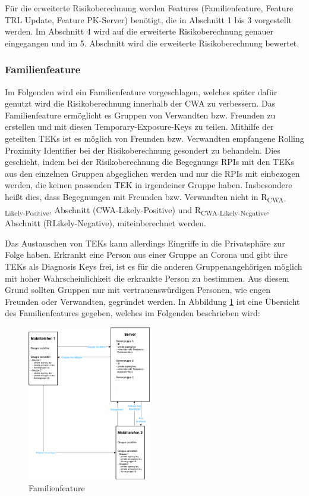\documentclass[conference]{IEEEtran}
\begin{document}
Für die erweiterte Risikoberechnung werden Features (Familienfeature, Feature TRL Update, 
Feature PK-Server) benötigt, die in Abschnitt 1 bis 3 vorgestellt werden.
Im Abschnitt 4 wird auf die erweiterte Risikoberechnung genauer eingegangen und im 5. Abschnitt wird die erweiterte Risikoberechnung bewertet.
\\
\subsubsection{Familienfeature}
\label{Familienfeature}
Im Folgenden wird ein Familienfeature vorgeschlagen, welches später dafür genutzt wird die Risikoberechnung innerhalb der CWA zu verbessern.
Das Familienfeature ermöglicht es Gruppen von Verwandten bzw. Freunden zu erstellen und mit diesen Temporary-Exposure-Keys zu teilen.
Mithilfe der geteilten TEKs ist es möglich von Freunden bzw. Verwandten empfangene Rolling Proximity Identifier bei der Risikoberechnung gesondert zu behandeln.
Dies geschieht, indem bei der Risikoberechnung die Begegnungs RPIs mit den TEKs aus den einzelnen Gruppen abgeglichen werden und nur die RPIs mit einbezogen werden, die keinen passenden TEK in irgendeiner Gruppe haben.
Insbesondere heißt dies, dass Begegnungen mit Freunden bzw. Verwandten nicht in R\textsubscript{CWA-Likely-Positive}, Abschnitt (CWA-Likely-Positive) und R\textsubscript{CWA-Likely-Negative}, Abschnitt (RLikely-Negative), miteinberechnet werden. 

Das Austauschen von TEKs kann allerdings Eingriffe in die Privatsphäre zur Folge haben.
Erkrankt eine Person aus einer Gruppe an Corona und gibt ihre TEKs als Diagnosis Keys frei, ist es für die anderen Gruppenangehörigen möglich mit hoher Wahrscheinlichkeit die erkrankte Person zu bestimmen.
Aus diesem Grund sollten Gruppen nur mit vertrauenswürdigen Personen, wie engen Freunden oder Verwandten, gegründet werden.
In Abbildung \ref{Familienfeature_Abbildung} ist eine Übersicht des Familienfeatures gegeben, welches im Folgenden beschrieben wird:

\begin{figure}[h]
	\centering
	\includegraphics[width=0.48\textwidth]{"Familiengruppe"}
	\caption{Familienfeature}
	\label{Familienfeature_Abbildung}
\end{figure}
\end{document}
